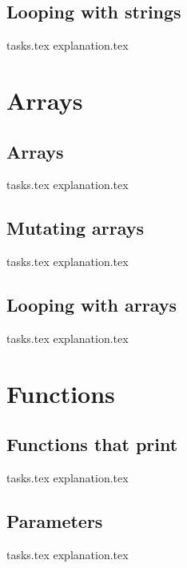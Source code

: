     \section{Looping with strings}
    {tasks.tex}      \newpage
    {explanation.tex}   \newpage \mbox{} \newpage

    \chapter{Arrays}
    \newpage

    \section{Arrays}
    {tasks.tex}            \newpage
    {explanation.tex}         \newpage

    \section{Mutating arrays}
    {tasks.tex}          \newpage
    {explanation.tex}       \newpage

    \section{Looping with arrays}
    {tasks.tex}       \newpage
    {explanation.tex}    \newpage

    \chapter{Functions}
    \newpage

    \section{Functions that print}
    {tasks.tex}        \newpage
    {explanation.tex}     \newpage

    \section{Parameters}
    {tasks.tex}       \newpage
    {explanation.tex}    \newpage

